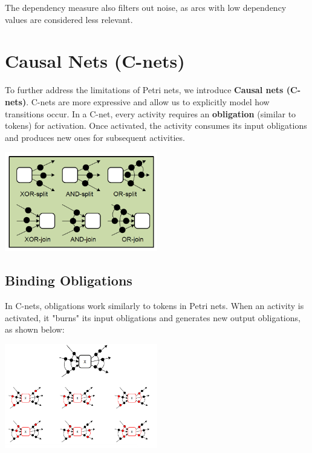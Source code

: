 The dependency measure also filters out noise, as arcs with low dependency values are considered less relevant.

\section{Causal Nets (C-nets)}

To further address the limitations of Petri nets, we introduce \textbf{Causal nets (C-nets)}. C-nets are more expressive and allow us to explicitly model how transitions occur. In a C-net, every activity requires an \textbf{obligation} (similar to tokens) for activation. Once activated, the activity consumes its input obligations and produces new ones for subsequent activities.

\begin{center}
    \includegraphics[width=0.5\textwidth]{capitolo 6/6 cnet notation.png} %
\end{center}

\subsection{Binding Obligations}
In C-nets, obligations work similarly to tokens in Petri nets. When an activity is activated, it "burns" its input obligations and generates new output obligations, as shown below:

\begin{center}
    \includegraphics[width=0.5\textwidth]{capitolo 6/6 binding.png} %
\end{center}

